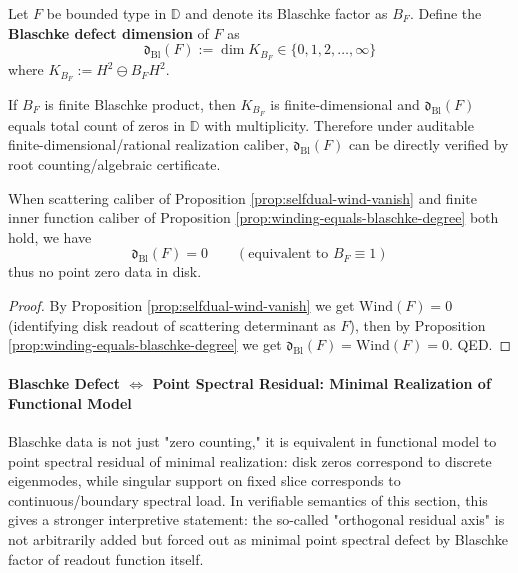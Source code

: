 \begin{definition}\label{def:blaschke-defect-dimension}
Let \(F\) be bounded type in \(\mathbb{D}\) and denote its Blaschke factor as \(B_F\).
Define the \textbf{Blaschke defect dimension} of \(F\) as
\[
\boxed{\;\mathfrak{d}_{\mathrm{Bl}}(F):=\dim K_{B_F}\in\{0,1,2,\dots,\infty\}\;}
\]
where \(K_{B_F}:=H^2\ominus B_FH^2\).
\end{definition}

\begin{remark}\label{rem:blaschke-defect-finite}
If \(B_F\) is finite Blaschke product, then \(K_{B_F}\) is finite-dimensional and \(\mathfrak{d}_{\mathrm{Bl}}(F)\) equals total count of zeros in \(\mathbb{D}\) with multiplicity.
Therefore under auditable finite-dimensional/rational realization caliber, \(\mathfrak{d}_{\mathrm{Bl}}(F)\) can be directly verified by root counting/algebraic certificate.
\end{remark}

\begin{corollary}\label{cor:selfdual-index-vanish-implies-dbl0}
When scattering caliber of Proposition \ref{prop:selfdual-wind-vanish} and finite inner function caliber of Proposition \ref{prop:winding-equals-blaschke-degree} both hold, we have
\[
\boxed{\;\mathfrak d_{\mathrm{Bl}}(F)=0\qquad(\text{equivalent to }B_F\equiv 1)\;}
\]
thus no point zero data in disk.
\end{corollary}

\begin{proof}
By Proposition \ref{prop:selfdual-wind-vanish} we get \(\mathrm{Wind}(F)=0\) (identifying disk readout of scattering determinant as \(F\)), then by Proposition \ref{prop:winding-equals-blaschke-degree} we get \(\mathfrak d_{\mathrm{Bl}}(F)=\mathrm{Wind}(F)=0\). QED.
\end{proof}

\paragraph{Blaschke Defect \texorpdfstring{$\Leftrightarrow$}{<->} Point Spectral Residual: Minimal Realization of Functional Model}
Blaschke data is not just "zero counting," it is equivalent in functional model to point spectral residual of minimal realization: disk zeros correspond to discrete eigenmodes, while singular support on fixed slice corresponds to continuous/boundary spectral load.
In verifiable semantics of this section, this gives a stronger interpretive statement: the so-called "orthogonal residual axis" is not arbitrarily added but forced out as minimal point spectral defect by Blaschke factor of readout function itself.

